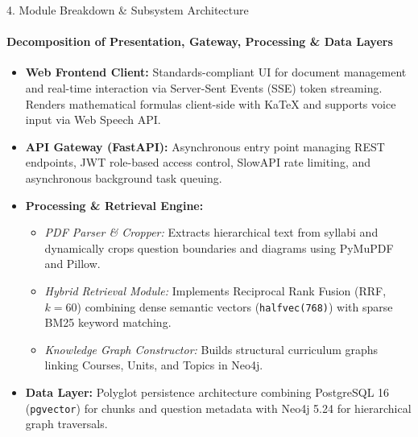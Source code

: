 \documentclass[aspectratio=169, 11pt]{beamer}
\begin{document}
\begin{frame}{4. Module Breakdown \& Subsystem Architecture}
    \framesubtitle{Decomposition of Presentation, Gateway, Processing \& Data Layers}
    \begin{itemize}
        \item \textbf{Web Frontend Client:} Standards-compliant UI for document management and real-time interaction via Server-Sent Events (SSE) token streaming. Renders mathematical formulas client-side with KaTeX and supports voice input via Web Speech API.
        \item \textbf{API Gateway (FastAPI):} Asynchronous entry point managing REST endpoints, JWT role-based access control, SlowAPI rate limiting, and asynchronous background task queuing.
        \item \textbf{Processing \& Retrieval Engine:}
        \begin{itemize}
            \item \textit{PDF Parser \& Cropper:} Extracts hierarchical text from syllabi and dynamically crops question boundaries and diagrams using PyMuPDF and Pillow.
            \item \textit{Hybrid Retrieval Module:} Implements Reciprocal Rank Fusion (RRF, $k=60$) combining dense semantic vectors (\texttt{halfvec(768)}) with sparse BM25 keyword matching.
            \item \textit{Knowledge Graph Constructor:} Builds structural curriculum graphs linking Courses, Units, and Topics in Neo4j.
        \end{itemize}
        \item \textbf{Data Layer:} Polyglot persistence architecture combining PostgreSQL 16 (\texttt{pgvector}) for chunks and question metadata with Neo4j 5.24 for hierarchical graph traversals.
    \end{itemize}
\end{frame}
\end{document}
